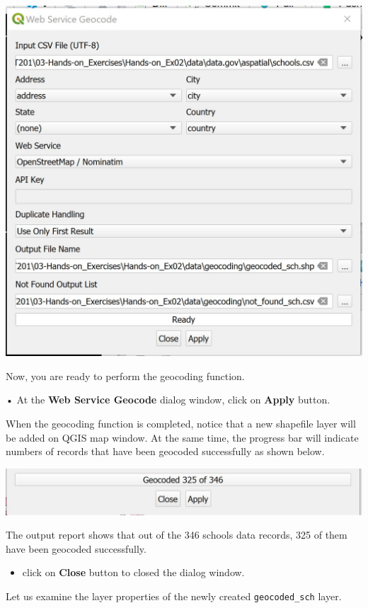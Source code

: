 \documentclass[
  letterpaper,
  DIV=11,
  numbers=noendperiod]{scrreprt}
\providecommand{\tightlist}{%
  \setlength{\itemsep}{0pt}\setlength{\parskip}{0pt}}\usepackage{longtable,booktabs,array}
\begin{document}
\includegraphics{./img02/image22.jpg}

Now, you are ready to perform the geocoding function.

• At the \textbf{Web Service Geocode} dialog window, click on
\textbf{Apply} button.

When the geocoding function is completed, notice that a new shapefile
layer will be added on QGIS map window. At the same time, the progress
bar will indicate numbers of records that have been geocoded
successfully as shown below.

\includegraphics{./img02/image23.jpg}

The output report shows that out of the 346 schools data records, 325 of
them have been geocoded successfully.

\begin{itemize}
\tightlist
\item
  click on \textbf{Close} button to closed the dialog window.
\end{itemize}

Let us examine the layer properties of the newly created
\texttt{geocoded\_sch} layer.
\end{document}
